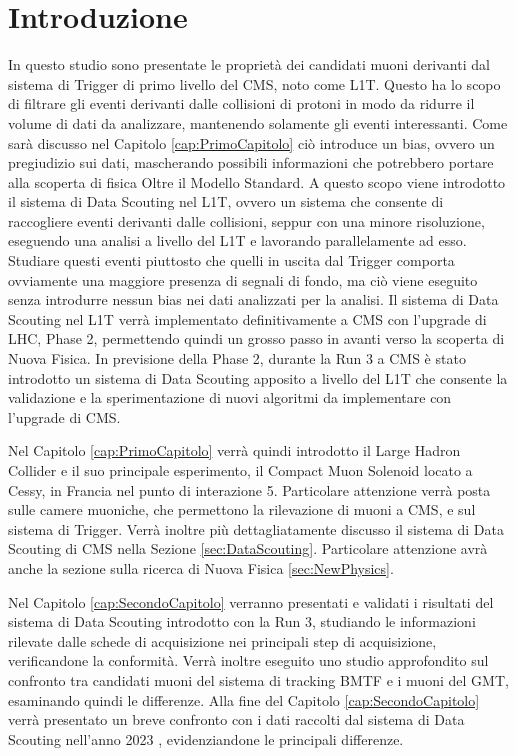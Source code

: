 \chapter{Introduzione}
\label{cap:Introduzione}

In questo studio sono presentate le proprietà dei candidati muoni derivanti dal sistema di Trigger di primo livello del CMS, noto come L1T. Questo ha lo scopo di filtrare gli eventi derivanti dalle collisioni di protoni in modo da ridurre il volume di dati da analizzare, mantenendo solamente gli eventi interessanti. Come sarà discusso nel Capitolo \ref{cap:PrimoCapitolo} ciò introduce un bias, ovvero un pregiudizio sui dati, mascherando possibili informazioni che potrebbero portare alla scoperta di fisica Oltre il Modello Standard. A questo scopo viene introdotto il sistema di Data Scouting nel L1T, ovvero un sistema che consente di raccogliere eventi derivanti dalle collisioni, seppur con una minore risoluzione, eseguendo una analisi a livello del L1T e lavorando parallelamente ad esso. Studiare questi eventi piuttosto che quelli in uscita dal Trigger comporta ovviamente una maggiore presenza di segnali di fondo, ma ciò viene eseguito senza introdurre nessun bias nei dati analizzati per la analisi. Il sistema di Data Scouting nel L1T verrà implementato definitivamente a CMS con l'upgrade di LHC, Phase 2, permettendo quindi un grosso passo in avanti verso la scoperta di Nuova Fisica. In previsione della Phase 2, durante la Run 3 a CMS è stato introdotto un sistema di Data Scouting apposito a livello del L1T che consente la validazione e la sperimentazione di nuovi algoritmi da implementare con l'upgrade di CMS.


Nel Capitolo \ref{cap:PrimoCapitolo} verrà quindi introdotto il Large Hadron Collider e il suo principale esperimento, il Compact Muon Solenoid locato a Cessy, in Francia nel punto di interazione 5. Particolare attenzione verrà posta sulle camere muoniche, che permettono la rilevazione di muoni a CMS, e sul sistema di Trigger. Verrà inoltre più dettagliatamente discusso il sistema di Data Scouting di CMS nella Sezione \ref{sec:DataScouting}. Particolare attenzione avrà anche la sezione sulla ricerca di Nuova Fisica \ref{sec:NewPhysics}.

Nel Capitolo \ref{cap:SecondoCapitolo} verranno presentati e validati i risultati del sistema di Data Scouting introdotto con la Run 3, studiando le informazioni rilevate dalle schede di acquisizione nei principali step di acquisizione, verificandone la conformità. Verrà inoltre eseguito uno studio approfondito sul confronto tra candidati muoni del sistema di tracking BMTF e i muoni del GMT, esaminando quindi le differenze. Alla fine del Capitolo \ref{cap:SecondoCapitolo} verrà presentato un breve confronto con i dati raccolti dal sistema di Data Scouting nell'anno 2023 \cite{CERNsummerSchool}, evidenziandone le principali differenze.

